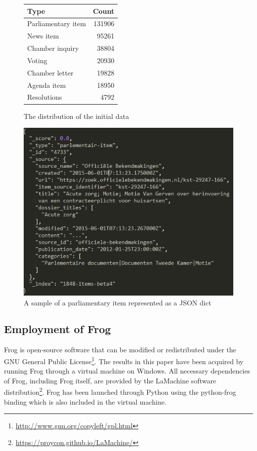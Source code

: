 \begin{figure} \label{fig:data_dis}
\centering
\begin{tabular}{l|r}
Type              & Count \\
\hline
Parliamentary item & 131906  \\
News item & 95261 \\
Chamber inquiry & 38804  \\
Voting & 20930 \\
Chamber letter & 19828 \\
Agenda item & 18950  \\
Resolutions & 4792 \\
\end{tabular}
\caption{The distribution of the initial data}
\end{figure}

\begin{figure}
    \centering
    \includegraphics[scale=0.8]{fig/data_format}
    \caption{A sample of a parliamentary item represented as a JSON dict}
    \label{fig:data_form}
\end{figure}

\subsection{Employment of Frog}\label{subsec:frog_emp}
Frog is open-source software that can be modified or redistributed under the GNU General Public License\footnote{\url{http://www.gnu.org/copyleft/gpl.html}}. The results in this paper have been acquired by running Frog through a virtual machine on Windows. All necessary dependencies of Frog, including Frog itself, are provided by the LaMachine software distribution\footnote{\url{https://proycon.github.io/LaMachine/}}. Frog has been launched through Python using the python-frog binding which is also included in the virtual machine.

